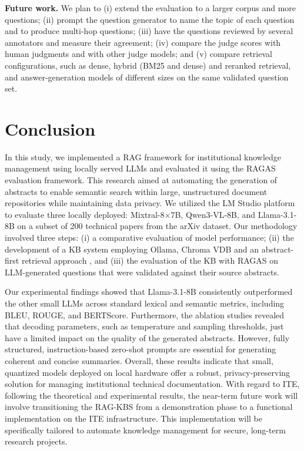 \documentclass[bdcc,article,submit,pdftex,moreauthors]{Definitions/mdpi}
\newcommand{\commentRed}[1]{\textcolor{red}{#1}}
\begin{document}
\textbf{Future work.}  We plan to (i) extend the evaluation to a larger corpus and more questions; (ii) prompt the question generator to name the topic of each question and to produce multi-hop questions; (iii) have the questions reviewed by several annotators and measure their agreement; (iv) compare the judge scores with human judgments and with other judge models; and (v) compare retrieval configurations, such as dense, hybrid (BM25 and dense) and reranked retrieval, and answer-generation models of different sizes on the same validated question set.

\section{Conclusion}
\label{sec:conclusion}
In this study, we implemented a RAG framework for institutional knowledge management using locally served LLMs and evaluated it using the RAGAS evaluation framework. 
This research aimed at automating the generation of abstracts to enable semantic search within large, unstructured document repositories while maintaining data privacy. 
We utilized the LM Studio platform to evaluate three locally deployed: Mixtral-8$\times$7B, Qwen3-VL-8B, and Llama-3.1-8B on a subset of 200 technical papers from the arXiv dataset. Our methodology involved  three steps: (i) a comparative evaluation of model performance;  (ii) the development of a KB system employing Ollama, Chroma VDB and an abstract-first retrieval approach , and (iii) the evaluation of the KB with RAGAS on LLM-generated questions that were validated against their source abstracts. %

Our experimental findings showed that Llama-3.1-8B consistently outperformed the other small LLMs across standard lexical and semantic metrics, including BLEU, ROUGE, and BERTScore. Furthermore, the ablation studies revealed that decoding parameters, such as temperature and sampling thresholds, just have a limited impact on the quality of the generated abstracts. However, fully structured, instruction-based zero-shot prompts are essential for generating coherent and concise summaries. Overall, these results indicate that small, quantized models deployed on local hardware offer a robust, privacy-preserving solution for managing institutional technical documentation. With  regard to ITE, following the theoretical and experimental results, the near-term future work will involve transitioning the RAG-KBS from a demonstration phase to a functional implementation on the ITE infrastructure. This implementation will be specifically tailored to automate knowledge management for secure, long-term research projects. %
\end{document}
